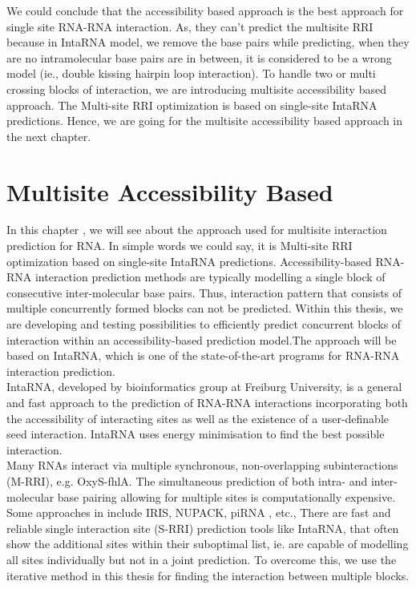 \documentclass[twoside,a4paper]{report}
\begin{document}
	We could conclude that the accessibility based approach is the best approach for single site RNA-RNA interaction. As, they can't predict the multisite RRI because in IntaRNA model, we remove the base pairs while predicting, when they are no intramolecular base pairs are in between, it is considered to be a wrong model (ie., double kissing hairpin loop interaction).  To handle two or multi crossing blocks of interaction, we are introducing multisite accessibility based approach. The Multi-site RRI optimization is based on single-site IntaRNA predictions. Hence, we are going for the multisite accessibility based approach in the next chapter.\\

		
		
		
	\chapter{Multisite Accessibility Based  }
	
	In this chapter , we will see about the approach used for multisite interaction prediction for RNA. In simple words we could say, it is Multi-site RRI optimization based on single-site IntaRNA predictions. Accessibility-based RNA-RNA interaction prediction methods are typically modelling a single block of consecutive inter-molecular base pairs. Thus, interaction pattern that consists of multiple concurrently formed blocks can not be predicted. Within this thesis, we are developing and testing possibilities to efficiently predict concurrent blocks of interaction within an accessibility-based prediction model.The approach will be based on IntaRNA, which is one of the state-of-the-art programs for RNA-RNA interaction prediction.\\
	
	IntaRNA, developed by \citep{busch2008intarna} bioinformatics group at Freiburg University, is a general and fast approach to the prediction of RNA-RNA interactions incorporating both the accessibility of interacting sites as well as the existence of a user-definable seed interaction.  IntaRNA uses energy minimisation to find the best possible interaction.  \\
	
	Many RNAs interact via multiple synchronous, non-overlapping subinteractions (M-RRI), e.g. OxyS-fhlA. The simultaneous prediction of both intra- and inter-molecular base pairing allowing for multiple sites is computationally expensive. Some approaches in include IRIS, NUPACK, piRNA , etc., There are fast and reliable single interaction site (S-RRI) prediction tools like IntaRNA, that often show the additional sites within their suboptimal list, ie. are capable of modelling all sites individually but not in a joint prediction.	To overcome this, we use the iterative method in this thesis for finding the interaction between multiple blocks. \\
	
\end{document}
